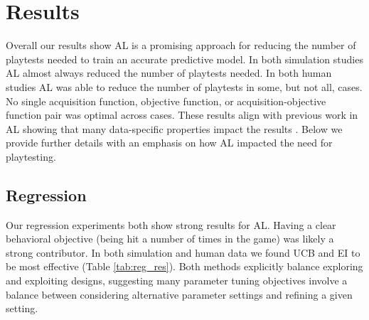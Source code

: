 \documentclass{sig-alternate}
\begin{document}




\section{Results}

Overall our results show AL is a promising approach for reducing the number of playtests needed to train an accurate predictive model.
In both simulation studies AL almost always reduced the number of playtests needed.
In both human studies AL was able to reduce the number of playtests in some, but not all, cases.
No single acquisition function, objective function, or acquisition-objective function pair was optimal across cases.
These results align with previous work in AL showing that many data-specific properties impact the results \cite{schein2007:al-logreg-eval}.
Below we provide further details with an emphasis on how AL impacted the need for playtesting.


\subsection{Regression}

Our regression experiments both show strong results for AL.
Having a clear behavioral objective (being hit a number of times in the game) was likely a strong contributor.
In both simulation and human data we found UCB and EI to be most effective (Table \ref{tab:reg_res}).
Both methods explicitly balance exploring and exploiting designs, suggesting many parameter tuning objectives involve a balance between considering alternative parameter settings and refining a given setting.

\end{document}
